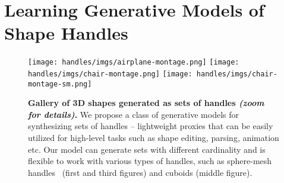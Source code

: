 \chapter{Learning Generative Models of Shape Handles}

\begin{figure}[h!]
\centering
  \texttt{[image: handles/imgs/airplane-montage.png]}
  \texttt{[image: handles/imgs/chair-montage.png]}
  \texttt{[image: handles/imgs/chair-montage-sm.png]}
  \caption{\small\label{fig:bunny} 
  \textbf{Gallery of 3D shapes generated as sets of handles \emph{(zoom for details)}.}
  We propose a class of generative models for synthesizing sets of handles --
  lightweight proxies that can be easily utilized for high-level tasks such as shape editing, parsing, animation etc.
  Our model can generate sets with different cardinality and is flexible to work with various types of handles, such as sphere-mesh handles~\cite{spheremesh} (first and third figures) and 
  cuboids (middle figure).
  }
 \end{figure}







